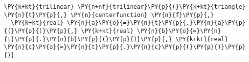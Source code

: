 \begin{Verbatim}[commandchars=\\\{\}]
  \PY{k+kt}{trilinear} \PY{n+nf}{trilinear}\PY{p}{(}\PY{k+kt}{triangle} \PY{n}{t}\PY{p}{,} \PY{n}{centerfunction} \PY{n}{f}\PY{p}{,}
  \PY{k+kt}{real} \PY{n}{a}\PY{o}{=}\PY{n}{t}\PY{p}{.}\PY{n}{a}\PY{p}{(}\PY{p}{)}\PY{p}{,} \PY{k+kt}{real} \PY{n}{b}\PY{o}{=}\PY{n}{t}\PY{p}{.}\PY{n}{b}\PY{p}{(}\PY{p}{)}\PY{p}{,} \PY{k+kt}{real} \PY{n}{c}\PY{o}{=}\PY{n}{t}\PY{p}{.}\PY{n}{c}\PY{p}{(}\PY{p}{)}\PY{p}{)}
\end{Verbatim}

